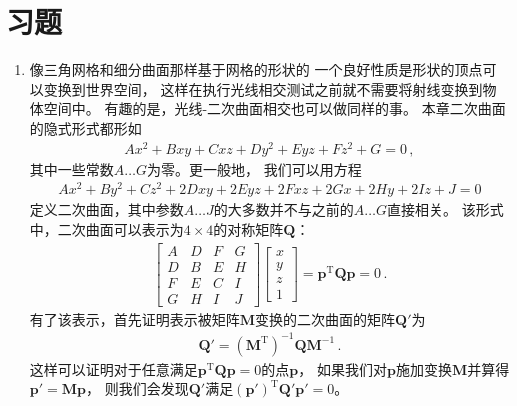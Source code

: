 \section{习题}\label{sec:习题03}

\begin{enumerate}
    \item \circletwo 像三角网格和细分曲面那样基于网格的形状的
          一个良好性质是形状的顶点可以变换到世界空间，
          这样在执行光线相交测试之前就不需要将射线变换到物体空间中。
          有趣的是，光线-二次曲面相交也可以做同样的事。
          本章二次曲面的隐式形式都形如
          \begin{align*}
              Ax^2+Bxy+Cxz+Dy^2+Eyz+Fz^2+G=0\, ,
          \end{align*}
          其中一些常数$A\ldots G$为零。更一般地，
          我们可以用方程
          \begin{align*}
              Ax^2+By^2+Cz^2+2Dxy+2Eyz+2Fxz+2Gx+2Hy+2Iz+J=0
          \end{align*}
          定义二次曲面，其中参数$A\ldots J$的大多数并不与之前的$A\ldots G$直接相关。
          该形式中，二次曲面可以表示为$4\times4$的对称矩阵$\bm Q$：
          \begin{align*}
              [x\ y\ z\ 1]\left[
                  \begin{array}{cccc}
                      A & D & F & G \\
                      D & B & E & H \\
                      F & E & C & I \\
                      G & H & I & J
                  \end{array}
                  \right]\left[\begin{array}{c}
                      x \\y\\z\\1
                  \end{array}\right]=\bm p^{\mathrm{T}}\bm Q\bm p=0\, .
          \end{align*}
          有了该表示，首先证明表示被矩阵$\bm M$变换的二次曲面的矩阵$\bm Q'$为
          \begin{align*}
              \bm Q'=(\bm M^{\mathrm{T}})^{-1}\bm Q\bm M^{-1}\, .
          \end{align*}
          这样可以证明对于任意满足$\bm p^{\mathrm{T}}\bm Q\bm p=0$的点$\bm p$，
          如果我们对$\bm p$施加变换$\bm M$并算得$\bm p'=\bm M\bm p$，
          则我们会发现$\bm Q'$满足$(\bm p')^{\mathrm{T}}\bm Q'\bm p'=0$。

\end{enumerate}
